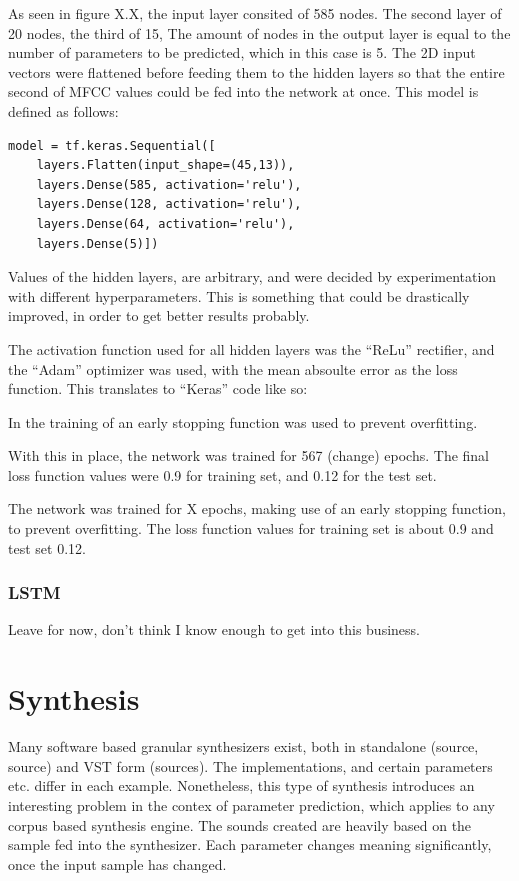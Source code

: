 As seen in figure X.X, the input layer consited of 585 nodes. The
second layer of 20 nodes, the third of 15, The amount of nodes in the
output layer is equal to the number of parameters to be predicted,
which in this case is 5. The 2D input vectors were flattened before
feeding them to the hidden layers so that the entire second of MFCC
values could be fed into the network at once. This model is defined as
follows: 
\begin{lstlisting}
model = tf.keras.Sequential([
    layers.Flatten(input_shape=(45,13)),
    layers.Dense(585, activation='relu'),
    layers.Dense(128, activation='relu'),
    layers.Dense(64, activation='relu'),
    layers.Dense(5)])
\end{lstlisting}

Values of the hidden layers, are arbitrary, and were decided
by experimentation with different hyperparameters. This is something
that could be drastically improved, in order to get better results
probably.

The activation function used for all hidden layers was the ``ReLu''
rectifier, and the ``Adam'' optimizer was used, with the mean absoulte
error as the loss function. This translates to ``Keras'' code like so:

In the training of an early stopping function was used to prevent
overfitting.

With this in place, the network was trained for 567 (change)
epochs. The final loss function values were 0.9 for training set, and
0.12 for the test set.

The network was trained for X epochs, making use
of an early stopping function, to prevent overfitting. The loss
function values for training set is about 0.9 and test set 0.12.

\subsubsection{LSTM}

Leave for now, don't think I know enough to get into this business.

\section{Synthesis}
Many software based granular synthesizers exist, both in standalone
(source, source) and VST form (sources). The implementations, and
certain parameters etc. differ in each example. Nonetheless, this type
of synthesis introduces an interesting problem in the contex of
parameter prediction, which applies to any corpus based synthesis
engine. The sounds created are heavily based on the sample fed into
the synthesizer. Each parameter changes meaning significantly, once
the input sample has changed. 

